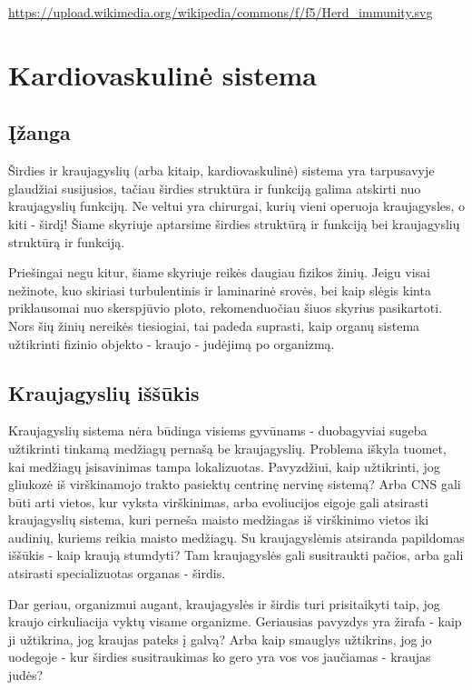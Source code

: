 \documentclass[]{book}
\begin{document}
\url{https://upload.wikimedia.org/wikipedia/commons/f/f5/Herd_immunity.svg}

\hypertarget{kardiovaskuline-sistema}{%
\chapter{Kardiovaskulinė sistema}\label{kardiovaskuline-sistema}}

\hypertarget{izanga-1}{%
\section{Įžanga}\label{izanga-1}}

Širdies ir kraujagyslių (arba kitaip, kardiovaskulinė) sistema yra tarpusavyje glaudžiai susijusios, tačiau širdies struktūra ir funkciją galima atskirti nuo kraujagyslių funkcijų. Ne veltui yra chirurgai, kurių vieni operuoja kraujagysles, o kiti - širdį! Šiame skyriuje aptarsime širdies struktūrą ir funkciją bei kraujagyslių struktūrą ir funkciją.

Priešingai negu kitur, šiame skyriuje reikės daugiau fizikos žinių. Jeigu visai nežinote, kuo skiriasi turbulentinis ir laminarinė srovės, bei kaip slėgis kinta priklausomai nuo skerspjūvio ploto, rekomenduočiau šiuos skyrius pasikartoti. Nors šių žinių nereikės tiesiogiai, tai padeda suprasti, kaip organų sistema užtikrinti fizinio objekto - kraujo - judėjimą po organizmą.

\hypertarget{kraujagysliu-issukis}{%
\section{Kraujagyslių iššūkis}\label{kraujagysliu-issukis}}

Kraujagyslių sistema nėra būdinga visiems gyvūnams - duobagyviai sugeba užtikrinti tinkamą medžiagų pernašą be kraujagyslių. Problema iškyla tuomet, kai medžiagų įsisavinimas tampa lokalizuotas. Pavyzdžiui, kaip užtikrinti, jog gliukozė iš virškinamojo trakto pasiektų centrinę nervinę sistemą? Arba CNS gali būti arti vietos, kur vyksta virškinimas, arba evoliucijos eigoje gali atsirasti kraujagyslių sistema, kuri perneša maisto medžiagas iš virškinimo vietos iki audinių, kuriems reikia maisto medžiagų. Su kraujagyslėmis atsiranda papildomas iššūkis - kaip kraują stumdyti? Tam kraujagyslės gali susitraukti pačios, arba gali atsirasti specializuotas organas - širdis.

Dar geriau, organizmui augant, kraujagyslės ir širdis turi prisitaikyti taip, jog kraujo cirkuliacija vyktų visame organizme. Geriausias pavyzdys yra žirafa - kaip ji užtikrina, jog kraujas pateks į galvą? Arba kaip smauglys užtikrins, jog jo uodegoje - kur širdies susitraukimas ko gero yra vos vos jaučiamas - kraujas judės?
\end{document}

